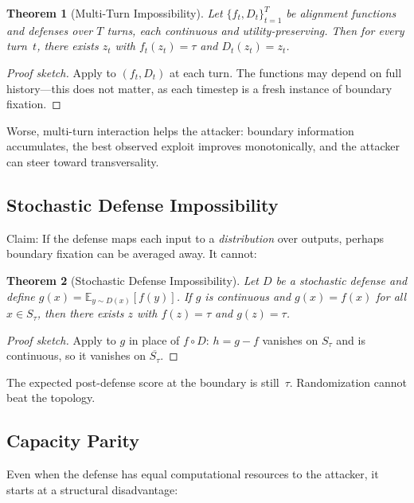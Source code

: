 \documentclass[11pt]{article}
\newtheorem{theorem}{Theorem}[section]
\newcommand{\cl}[1]{\overline{#1}}
\begin{document}
\begin{theorem}[Multi-Turn Impossibility]
\label{thm:multi-turn}
Let $\{f_t, D_t\}_{t=1}^T$ be alignment functions and defenses over
$T$ turns, each continuous and utility-preserving. Then for every
turn~$t$, there exists $z_t$ with $f_t(z_t) = \tau$ and
$D_t(z_t) = z_t$.
\end{theorem}

\begin{proof}[Proof sketch]
Apply  to $(f_t, D_t)$ at each turn. The functions may
depend on full history---this does not matter, as each timestep is a
fresh instance of boundary fixation.
\end{proof}

Worse, multi-turn interaction helps the attacker: boundary information
accumulates, the best observed exploit improves monotonically, and the
attacker can steer toward transversality.

\subsection{Stochastic Defense Impossibility}

Claim: If the defense maps each input to a
\emph{distribution} over outputs, perhaps boundary fixation can be
averaged away. It cannot:

\begin{theorem}[Stochastic Defense Impossibility]
\label{thm:stochastic}
Let $D$ be a stochastic defense and define
$g(x) = \mathbb{E}_{y \sim D(x)}[f(y)]$. If $g$ is continuous and
$g(x) = f(x)$ for all $x \in S_\tau$, then there exists $z$ with
$f(z) = \tau$ and $g(z) = \tau$.
\end{theorem}

\begin{proof}[Proof sketch]
Apply  to $g$ in place of $f \circ D$: $h = g - f$
vanishes on $S_\tau$ and is continuous, so it vanishes on $\cl{S_\tau}$.
\end{proof}

The expected post-defense score at the boundary is still~$\tau$.
Randomization cannot beat the topology.

\subsection{Capacity Parity}

Even when the defense has equal computational resources to the
attacker, it starts at a structural disadvantage:
\end{document}
